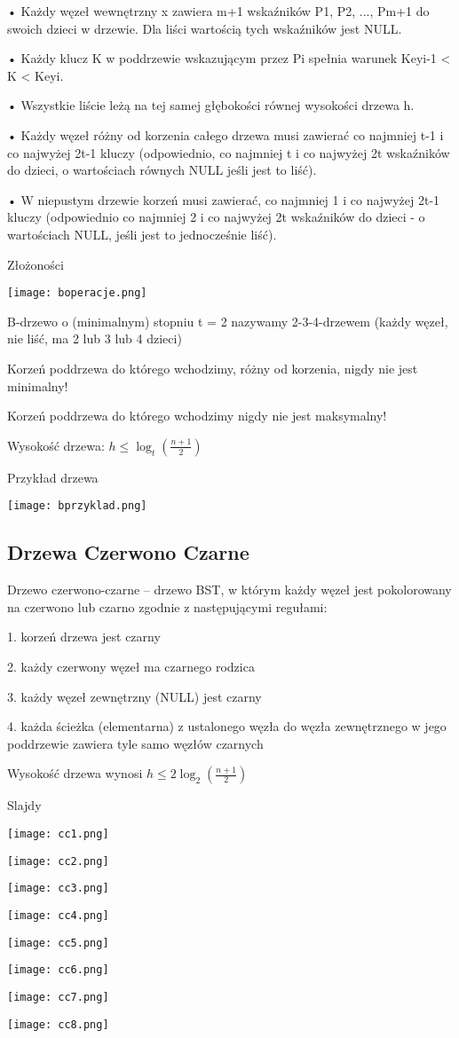 • Każdy węzeł wewnętrzny x zawiera m+1 wskaźników P1, P2, ..., Pm+1 do swoich dzieci w drzewie.
Dla liści wartością tych wskaźników jest NULL.

• Każdy klucz K w poddrzewie wskazującym przez Pi spełnia warunek Keyi-1 < K < Keyi.

• Wszystkie liście leżą na tej samej głębokości równej wysokości drzewa h.

• Każdy węzeł różny od korzenia całego drzewa musi zawierać co najmniej t-1 i co najwyżej 2t-1
kluczy (odpowiednio, co najmniej t i co najwyżej 2t wskaźników do dzieci, o wartościach
równych NULL jeśli jest to liść).

• W niepustym drzewie korzeń musi zawierać, co najmniej 1 i co najwyżej 2t-1 kluczy (odpowiednio
co najmniej 2 i co najwyżej 2t wskaźników do dzieci - o wartościach NULL, jeśli jest to
jednocześnie liść).

\entry 
Złożoności

\texttt{[image: boperacje.png]}

\entry 
B-drzewo o (minimalnym) stopniu t = 2 nazywamy 2-3-4-drzewem (każdy węzeł, nie liść, ma 2 lub 3 lub 4 dzieci)

\entry
Korzeń poddrzewa do którego wchodzimy, różny od korzenia, nigdy nie jest minimalny!

\entry
Korzeń poddrzewa do którego wchodzimy nigdy nie jest maksymalny!

\entry
Wysokość drzewa: $h \leq \log_t(\frac{n+1}{2})$

\entry
Przykład drzewa

\texttt{[image: bprzyklad.png]}

\subsection{Drzewa Czerwono Czarne}

\entry
Drzewo czerwono-czarne – drzewo BST, w którym każdy węzeł jest pokolorowany
na czerwono lub czarno zgodnie z następującymi regułami:

1. korzeń drzewa jest czarny

2. każdy czerwony węzeł ma czarnego rodzica

3. każdy węzeł zewnętrzny (NULL) jest czarny

4. każda ścieżka (elementarna) z ustalonego węzła do węzła zewnętrznego w jego
poddrzewie zawiera tyle samo węzłów czarnych

\entry
Wysokość drzewa wynosi $h \leq 2 \log_2(\frac{n+1}{2})$

\entry
Slajdy

\texttt{[image: cc1.png]}

\texttt{[image: cc2.png]}

\texttt{[image: cc3.png]}

\texttt{[image: cc4.png]}

\texttt{[image: cc5.png]}

\texttt{[image: cc6.png]}

\texttt{[image: cc7.png]}

\texttt{[image: cc8.png]}

